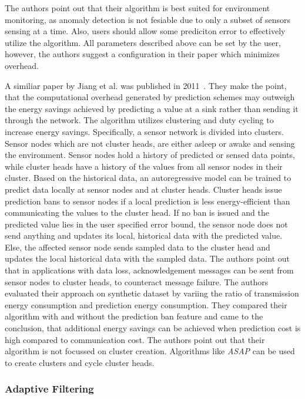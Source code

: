 The authors point out that their algorithm is best suited for environment
monitoring, as anomaly detection is not fesiable due to only a subset of
sensors sensing at a time. Also, users should allow some prediciton error to
effectively utilize the algorithm. All parameters described above can be set by
the user, however, the authors suggest a configuration in their paper which
minimizes overhead.
\par

A similiar paper by Jiang et al. was published in
2011~\cite{jiang2011prediction}. They make the point, that the computational
overhead generated by prediction schemes may outweigh the energy savings
achieved by predicting a value at a sink rather than sending it through the
network. The algorithm utilizes clustering and duty cycling to increase energy
savings. Specifically, a sensor network is divided into clusters. Sensor nodes
which are not cluster heads, are either asleep or awake and sensing the
environment. Sensor nodes hold a history of predicted or sensed data points,
while cluster heads have a history of the values from all sensor nodes in their
cluster. Based on the historical data, an autoregressive model can be trained
to predict data locally at sensor nodes and at cluster heads. Cluster heads
issue prediction bans to sensor nodes if a local prediction is less
energy-efficient than communicating the values to the cluster head. If no ban
is issued and the predicted value lies in the user specified error bound, the
sensor node does not send anything and updates its local, historical data with
the predicted value. Else, the affected sensor node sends sampled data to the
cluster head and updates the local historical data with the sampled data. The
authors point out that in applications with data loss, acknowledgement messages
can be sent from sensor nodes to cluster heads, to counteract message failure.
The authors evaluated their approach on synthetic dataset by variing the ratio
of transmission energy consumption and prediction energy consumption. They
compared their algorithm with and without the prediction ban feature and came
to the conclusion, that additional energy savings can be achieved when
prediction cost is high compared to communication cost. The authors point out
that their algorithm is not focussed on cluster creation. Algorithms like
\textit{ASAP} can be used to create clusters and cycle cluster heads.

\subsubsection{Adaptive Filtering}

